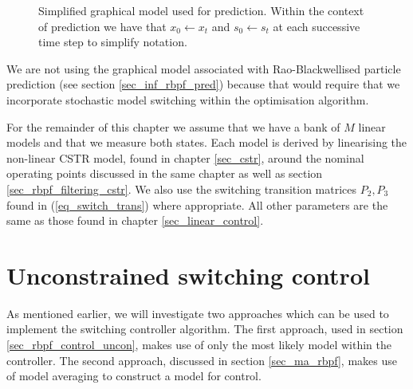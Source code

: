\begin{figure}[H] 
\centering
{}
\caption{Simplified graphical model used for prediction. Within the context of prediction we have that $x_0 \leftarrow x_t$ and $s_0 \leftarrow s_t$ at each successive time step to simplify notation.}
\label{fig_gm_prediction}
\end{figure}
We are not using the graphical model associated with Rao-Blackwellised particle prediction (see section \ref{sec_inf_rbpf_pred}) because that would require that we incorporate stochastic model switching within the optimisation algorithm. 

For the remainder of this chapter we assume that we have a bank of $M$ linear models and that we measure both states. Each model is derived by linearising the non-linear CSTR model, found in chapter \ref{sec_cstr}, around the nominal operating points discussed in the same chapter as well as section \ref{sec_rbpf_filtering_cstr}. We also use the switching transition matrices $P_2, P_3$ found in (\ref{eq_switch_trans}) where appropriate. All other parameters are the same as those found in chapter \ref{sec_linear_control}.
\section{Unconstrained switching control}
As mentioned earlier, we will investigate two approaches which can be used to implement the switching controller algorithm. The first approach, used in section \ref{sec_rbpf_control_uncon}, makes use of only the most likely model within the controller. The second approach, discussed in section \ref{sec_ma_rbpf}, makes use of model averaging to construct a model for control.  
